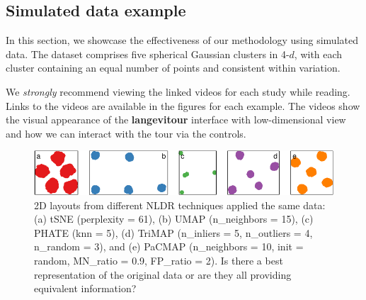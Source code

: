 \documentclass[
  12pt]{article}
\begin{document}
\hypertarget{sec-simpleex}{%
\subsection{Simulated data example}\label{sec-simpleex}}

In this section, we showcase the effectiveness of our methodology using
simulated data. The dataset comprises five spherical Gaussian clusters
in 4-\(d\), with each cluster containing an equal number of points and
consistent within variation.

We \emph{strongly} recommend viewing the linked videos for each study
while reading. Links to the videos are available in the figures for each
example. The videos show the visual appearance of the
\textbf{langevitour} interface with low-dimensional view and how we can
interact with the tour via the controls.

\begin{figure}

{\centering \includegraphics[width=1\textwidth,height=\textheight]{paper_files/figure-pdf/fig-nldervis5Gau-1.pdf}

}

\caption{\label{fig-nldervis5Gau}2D layouts from different NLDR
techniques applied the same data: (a) tSNE (perplexity = 61), (b) UMAP
(n\_neighbors = 15), (c) PHATE (knn = 5), (d) TriMAP (n\_inliers = 5,
n\_outliers = 4, n\_random = 3), and (e) PaCMAP (n\_neighbors = 10, init
= random, MN\_ratio = 0.9, FP\_ratio = 2). Is there a best
representation of the original data or are they all providing equivalent
information?}

\end{figure}
\end{document}
